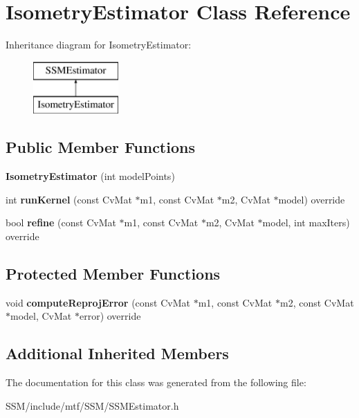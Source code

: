 \hypertarget{classIsometryEstimator}{\section{Isometry\-Estimator Class Reference}
\label{classIsometryEstimator}
}
Inheritance diagram for Isometry\-Estimator\-:\begin{figure}[H]
\begin{center}
\leavevmode
\includegraphics[height=2.000000cm]{classIsometryEstimator}
\end{center}
\end{figure}
\subsection*{Public Member Functions}
\begin{DoxyCompactItemize}
\item 
\hypertarget{classIsometryEstimator_ab7b5a2c0f2837e8a7ea890b1e1d59fff}{{\bfseries Isometry\-Estimator} (int model\-Points)}\label{classIsometryEstimator_ab7b5a2c0f2837e8a7ea890b1e1d59fff}

\item 
\hypertarget{classIsometryEstimator_a0a7343b7bf29c3d23ed7b1a8ac83361d}{int {\bfseries run\-Kernel} (const Cv\-Mat $\ast$m1, const Cv\-Mat $\ast$m2, Cv\-Mat $\ast$model) override}\label{classIsometryEstimator_a0a7343b7bf29c3d23ed7b1a8ac83361d}

\item 
\hypertarget{classIsometryEstimator_a30a124742c6f1175624de7f40188de52}{bool {\bfseries refine} (const Cv\-Mat $\ast$m1, const Cv\-Mat $\ast$m2, Cv\-Mat $\ast$model, int max\-Iters) override}\label{classIsometryEstimator_a30a124742c6f1175624de7f40188de52}

\end{DoxyCompactItemize}
\subsection*{Protected Member Functions}
\begin{DoxyCompactItemize}
\item 
\hypertarget{classIsometryEstimator_a33efeef43ea2d58b1919971fbf8d5468}{void {\bfseries compute\-Reproj\-Error} (const Cv\-Mat $\ast$m1, const Cv\-Mat $\ast$m2, const Cv\-Mat $\ast$model, Cv\-Mat $\ast$error) override}\label{classIsometryEstimator_a33efeef43ea2d58b1919971fbf8d5468}

\end{DoxyCompactItemize}
\subsection*{Additional Inherited Members}


The documentation for this class was generated from the following file\-:\begin{DoxyCompactItemize}
\item 
S\-S\-M/include/mtf/\-S\-S\-M/S\-S\-M\-Estimator.\-h\end{DoxyCompactItemize}
